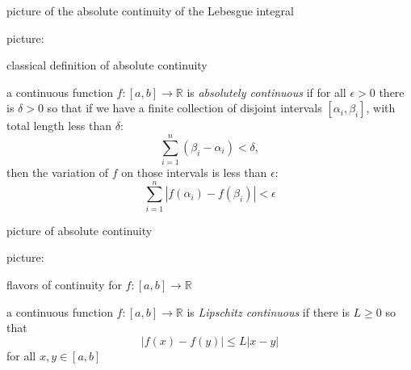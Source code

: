 \documentclass[10pt,
               svgnames,
               hyperref={colorlinks,
                         citecolor=DeepPink4,
                         linkcolor=FireBrick,
                         urlcolor=blue},
               usepdftitle=false]{beamer}
\newcommand{\RR}{\mathbb{R}}
\newcommand{\eps}{\epsilon}
\begin{document}
\begin{frame}{picture of the absolute continuity of the Lebesgue integral}

\noindent picture:

\vspace{70mm}
\end{frame}


\begin{frame}{classical definition of absolute continuity}

\begin{definition}
a continuous function $f:[a,b]\to\RR$ is \emph{absolutely continuous} if for all $\eps>0$ there is $\delta>0$ so that if we have a finite collection of disjoint intervals $[\alpha_i,\beta_i]$, with total length less than $\delta$:
	$$\sum_{i=1}^n (\beta_i - \alpha_i) <\delta,$$
then the variation of $f$ on those intervals is less than $\eps$:
	$$\sum_{i=1}^n |f(\alpha_i) - f(\beta_i)| < \eps$$
\end{definition}
\end{frame}


\begin{frame}{picture of absolute continuity}

\noindent picture:

\vspace{70mm}
\end{frame}


\begin{frame}{flavors of continuity for $f:[a,b]\to\RR$}

\begin{center}
\end{center}

\medskip
\begingroup
{}
\begin{definition}
\small
a continuous function $f:[a,b]\to\RR$ is \emph{Lipschitz continuous} if there is $L\ge 0$ so that
	$$|f(x)-f(y)| \le L|x-y|$$
for all $x,y\in [a,b]$
\end{definition}
\endgroup
\end{frame}
\end{document}

